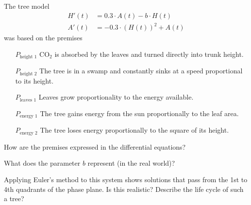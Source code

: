 \documentclass{workbook}
\begin{document}
\begin{slide}
	\question
	The tree model
	\begin{align*}
		H'(t) &= 0.3\cdot A(t)-b\cdot H(t)\\
		A'(t) &= -0.3\cdot (H(t))^2 + A(t)
	\end{align*}
	was based on the premises
	\begin{itemize}[leftmargin=3em]
		\item[ $P_{\text{height 1}}$] CO$_2$ is absorbed by the leaves and turned directly into trunk height.
		\item[ $P_{\text{height 2}}$] The tree is in a swamp and constantly sinks at a speed proportional to its height.
		\item[ $P_{\text{leaves 1}}$] Leaves grow proportionality to the energy available.
		\item[ $P_{\text{energy 1}}$] The tree gains energy from the sun proportionally to the leaf area.
		\item[ $P_{\text{energy 2}}$] The tree loses energy proportionally to the square of its height.
	\end{itemize}

	\begin{parts}
		\item How are the premises expressed in the differential equations?
		\item What does the parameter $b$ represent (in the real world)?
		\item Applying Euler's method to this system shows solutions that pass from the 1st to 4th quadrants of the phase plane.
			Is this realistic? Describe the life cycle of such a tree?
	\end{parts}
\end{slide}
\end{document}
